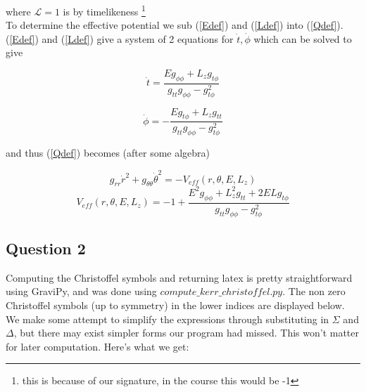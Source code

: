 \documentclass[10pt,a4paper]{report}
\begin{document}
where $\mathcal{L} = 1$ is by timelikeness \footnote{this is because of our signature, in the course this would be -1} \\

To determine the effective potential we sub (\ref{Edef}) and (\ref{Ldef}) into (\ref{Qdef}). (\ref{Edef}) and (\ref{Ldef}) give a system of 2 equations for $\dot{t}, \dot{\phi}$ which can be solved to give

\begin{equation}
\dot{t} = \frac{Eg_{\phi\phi}+L_zg_{t\phi}}{g_{tt}g_{\phi\phi}-g_{t\phi}^2}
\end{equation}

\begin{equation}
\dot{\phi} = -\frac{Eg_{t\phi}+L_zg_{tt}}{g_{tt}g_{\phi\phi}-g_{t\phi}^2}
\end{equation}

and thus (\ref{Qdef}) becomes (after some algebra)

\begin{equation}
g_{rr}\dot{r}^2+g_{\theta\theta}\dot{\theta}^2 = -V_{eff}(r, \theta, E, L_z)
\label{effpot}
\end{equation}
\begin{equation*}
V_{eff}(r, \theta, E, L_z) = -1 + \frac{E^2g_{\phi\phi} + L_z^2g_{tt} + 2ELg_{t\phi}}{g_{tt}g_{\phi\phi}-g_{t\phi}^2}
\end{equation*}

\subsection*{Question 2}
Computing the Christoffel symbols and returning latex is pretty straightforward using GraviPy, and was done using $compute\_kerr\_christoffel.py$. The non zero Christoffel symbols (up to symmetry) in the lower indices are displayed below. We make some attempt to simplify the expressions through substituting in $\Sigma$ and $\Delta$, but there may exist simpler forms our program had missed. This won't matter for later computation. Here's what we get:
\end{document}
